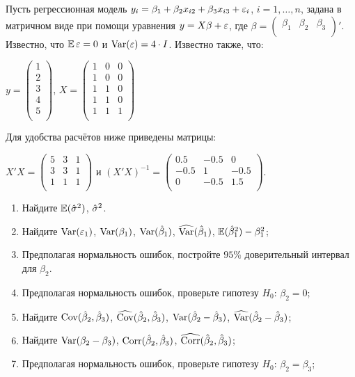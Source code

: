 \begin{problem}
Пусть регрессионная модель $y_i = \beta_1 + \beta_2 x_{i2} + \beta_3 x_{i3} + \varepsilon_i$, $i = 1, \ldots, n$, задана в матричном виде при помощи уравнения $y = X \beta + \varepsilon$, где $\beta =  \begin{pmatrix}
\beta_1 & \beta_2 & \beta_3\\
\end{pmatrix} '$. Известно, что $\operatorname{\mathbb E} \varepsilon = 0$ и $\operatorname{Var} (\varepsilon) = 4 \cdot I$. Известно также, что:

$y =  \begin{pmatrix}
1 \\
2 \\
3 \\
4 \\
5 \\
\end{pmatrix} $, $X =  \begin{pmatrix}
1 & 0 & 0 \\
1 & 0 & 0 \\
1 & 1 & 0 \\
1 & 1 & 0 \\
1 & 1 & 1 \\
\end{pmatrix} $

Для удобства расчётов ниже приведены матрицы:

$X' X =  \begin{pmatrix}
5 & 3 & 1 \\
3 & 3 & 1 \\
1 & 1 & 1 \\
\end{pmatrix} $ и $(X' X)^{-1} =  \begin{pmatrix}
0.5 & -0.5 & 0 \\
-0.5 & 1 & -0.5 \\
0 & -0.5 & 1.5 \\
\end{pmatrix} $.


\begin{enumerate}
\item Найдите $\operatorname{\mathbb E} (\hat{\sigma}^2)$, $\hat{\sigma}^2$.
\item Найдите $\operatorname{Var} (\varepsilon_1)$, $\operatorname{Var} (\beta_1)$, $\operatorname{Var} (\hat{\beta}_1)$, $\operatorname{\widehat{\operatorname{Var}}}(\hat{\beta}_1)$, $\operatorname{\mathbb E} (\hat{\beta}_1^2) - \beta_1^2$;
\item Предполагая нормальность ошибок, постройте $95\%$ доверительный интервал для $\beta_2$.
\item Предполагая нормальность ошибок, проверьте гипотезу $H_0$: $\beta_2 = 0$;
\item Найдите $\operatorname{Cov} (\hat{\beta}_2, \hat{\beta}_3)$, $\operatorname{\widehat{\operatorname{Cov}}}(\hat{\beta}_2, \hat{\beta}_3)$, $\operatorname{Var} (\hat{\beta}_2 - \hat{\beta}_3)$, $\operatorname{\widehat{\operatorname{Var}}}(\hat{\beta}_2 - \hat{\beta}_3)$;
\item Найдите $\operatorname{Var} (\beta_2 - \beta_3)$, $\operatorname{Corr} (\hat{\beta}_2, \hat{\beta}_3)$, $\operatorname{\widehat{\operatorname{Corr}}}(\hat{\beta}_2, \hat{\beta}_3)$;
\item Предполагая нормальность ошибок, проверьте гипотезу $H_0$: $\beta_2 = \beta_3$;
\end{enumerate}



\end{problem}
